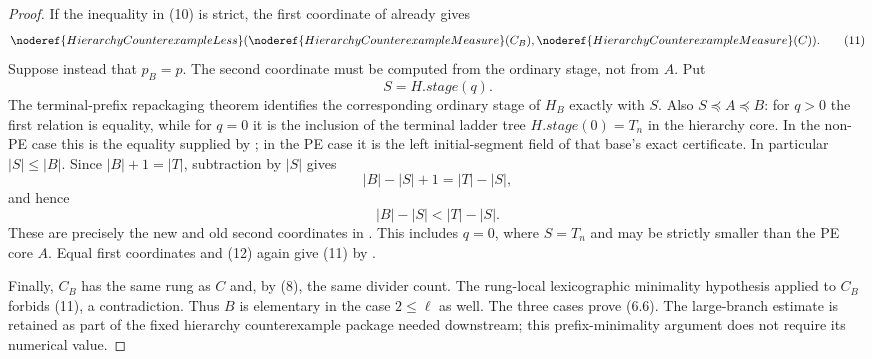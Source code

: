 \begin{proof}
If the inequality in (10) is strict, the first coordinate of
 already gives
\[
 \noderef{HierarchyCounterexampleLess}
   (\noderef{HierarchyCounterexampleMeasure}(C_B),
    \noderef{HierarchyCounterexampleMeasure}(C)).              \tag{11}
\]
Suppose instead that $p_B=p$.  The second coordinate must be computed
from the ordinary stage, not from $A$.  Put
\[
                         S=H.\mathit{stage}(q).
\]
The terminal-prefix repackaging theorem identifies the corresponding
ordinary stage of $H_B$ exactly with $S$.  Also
$S\preccurlyeq A\preccurlyeq B$: for $q>0$ the first relation is
equality, while for $q=0$ it is the inclusion of the terminal ladder
tree $H.\mathit{stage}(0)=T_n$ in the hierarchy core.  In the non-PE
case this is the equality supplied by ; in the PE
case it is the left initial-segment field of that base's exact
 certificate.  In particular $|S|\leq|B|$.  Since
$|B|+1=|T|$, subtraction by $|S|$ gives
\[
                 |B|-|S|+1=|T|-|S|,
\]
and hence
\[
                 |B|-|S|<|T|-|S|.                             \tag{12}
\]
These are precisely the new and old second coordinates in
.  This includes $q=0$, where
$S=T_n$ and may be strictly smaller than the PE core $A$.  Equal first
coordinates and (12) again give (11) by
.

Finally, $C_B$ has the same rung as $C$ and, by (8), the same divider
count.  The rung-local lexicographic minimality hypothesis applied to
$C_B$ forbids (11), a contradiction.  Thus $B$ is elementary in the
case $2\leq\ell$ as well.  The three cases prove (6.6).  The
large-branch estimate is retained as part of the fixed hierarchy
counterexample package needed downstream; this prefix-minimality
argument does not require its numerical value.
\end{proof}
